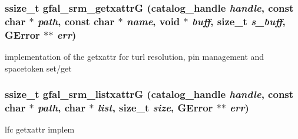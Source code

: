 \subsubsection{\setlength{\rightskip}{0pt plus 5cm}ssize\_\-t gfal\_\-srm\_\-getxattr\-G (catalog\_\-handle {\em handle}, const char $\ast$ {\em path}, const char $\ast$ {\em name}, void $\ast$ {\em buff}, size\_\-t {\em s\_\-buff}, GError $\ast$$\ast$ {\em err})}\label{gfal__common__srm__getxattr_8h_294634c95c41aced18458de57f4de555}


implementation of the getxattr for turl resolution, pin management and spacetoken set/get 
\subsubsection{\setlength{\rightskip}{0pt plus 5cm}ssize\_\-t gfal\_\-srm\_\-listxattr\-G (catalog\_\-handle {\em handle}, const char $\ast$ {\em path}, char $\ast$ {\em list}, size\_\-t {\em size}, GError $\ast$$\ast$ {\em err})}\label{gfal__common__srm__getxattr_8h_5ed727e9131d092843d162ad577287f7}


lfc getxattr implem 